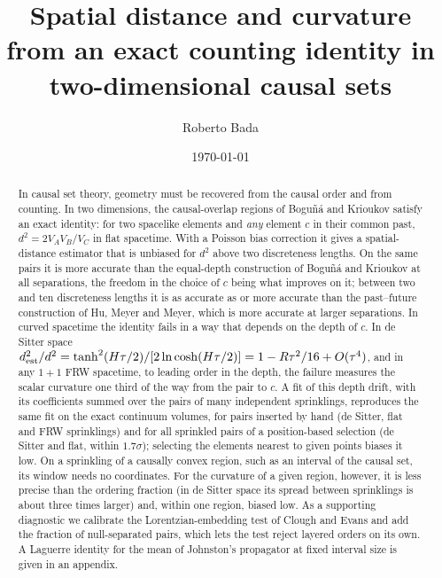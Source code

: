 \documentclass[prd,twocolumn,superscriptaddress,nofootinbib,amsmath,amssymb,floatfix]{revtex4-2}
\begin{document}
\title{Spatial distance and curvature from an exact counting identity in two-dimensional causal sets}

\author{Roberto Bada}

\date{\today}

\begin{abstract}
In causal set theory, geometry must be recovered from the causal order and from counting. In two dimensions, the causal-overlap regions of Bogu\~n\'a and Krioukov satisfy an exact identity: for two spacelike elements and \emph{any} element $c$ in their common past, $d^2=2V_AV_B/V_C$ in flat spacetime. With a Poisson bias correction it gives a spatial-distance estimator that is unbiased for $d^2$ above two discreteness lengths. On the same pairs it is more accurate than the equal-depth construction of Bogu\~n\'a and Krioukov at all separations, the freedom in the choice of $c$ being what improves on it; between two and ten discreteness lengths it is as accurate as or more accurate than the past--future construction of Hu, Meyer and Meyer, which is more accurate at larger separations. In curved spacetime the identity fails in a way that depends on the depth of $c$. In de Sitter space $d^2_{\rm est}/d^2=\tanh^2(H\tau/2)/[2\ln\cosh(H\tau/2)]=1-R\tau^2/16+O(\tau^4)$, and in any $1+1$ FRW spacetime, to leading order in the depth, the failure measures the scalar curvature one third of the way from the pair to $c$. A fit of this depth drift, with its coefficients summed over the pairs of many independent sprinklings, reproduces the same fit on the exact continuum volumes, for pairs inserted by hand (de Sitter, flat and FRW sprinklings) and for all sprinkled pairs of a position-based selection (de Sitter and flat, within $1.7\sigma$); selecting the elements nearest to given points biases it low. On a sprinkling of a causally convex region, such as an interval of the causal set, its window needs no coordinates. For the curvature of a given region, however, it is less precise than the ordering fraction (in de Sitter space its spread between sprinklings is about three times larger) and, within one region, biased low. As a supporting diagnostic we calibrate the Lorentzian-embedding test of Clough and Evans and add the fraction of null-separated pairs, which lets the test reject layered orders on its own. A Laguerre identity for the mean of Johnston's propagator at fixed interval size is given in an appendix.
\end{abstract}
\end{document}
